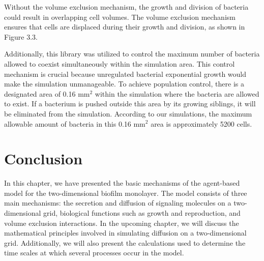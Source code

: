 Without the volume exclusion mechanism, the growth and division of bacteria could result in overlapping cell volumes. The volume exclusion mechanism ensures that cells are displaced during their growth and division, as shown in Figure 3.3.

Additionally, this library was utilized to control the maximum number of bacteria allowed to coexist simultaneously within the simulation area. This control mechanism is crucial because unregulated bacterial exponential growth would make the simulation unmanageable. To achieve population control, there is a designated area of 0.16 mm\(^2\) within the simulation where the bacteria are allowed to exist. If a bacterium is pushed outside this area by its growing siblings, it will be eliminated from the simulation. According to our simulations, the maximum allowable amount of bacteria in this 0.16 mm\(^2\) area is approximately 5200 cells.


\section{Conclusion}\label{sec:contrib1:conclusion}




In this chapter, we have presented the basic mechanisms of the agent-based model for the two-dimensional biofilm monolayer. The model consists of three main mechanisms: the secretion and diffusion of signaling molecules on a two-dimensional grid, biological functions such as growth and reproduction, and volume exclusion interactions. In the upcoming chapter, we will discuss the mathematical principles involved in simulating diffusion on a two-dimensional grid. Additionally, we will also present the calculations used to determine the time scales at which several processes occur in the model.
